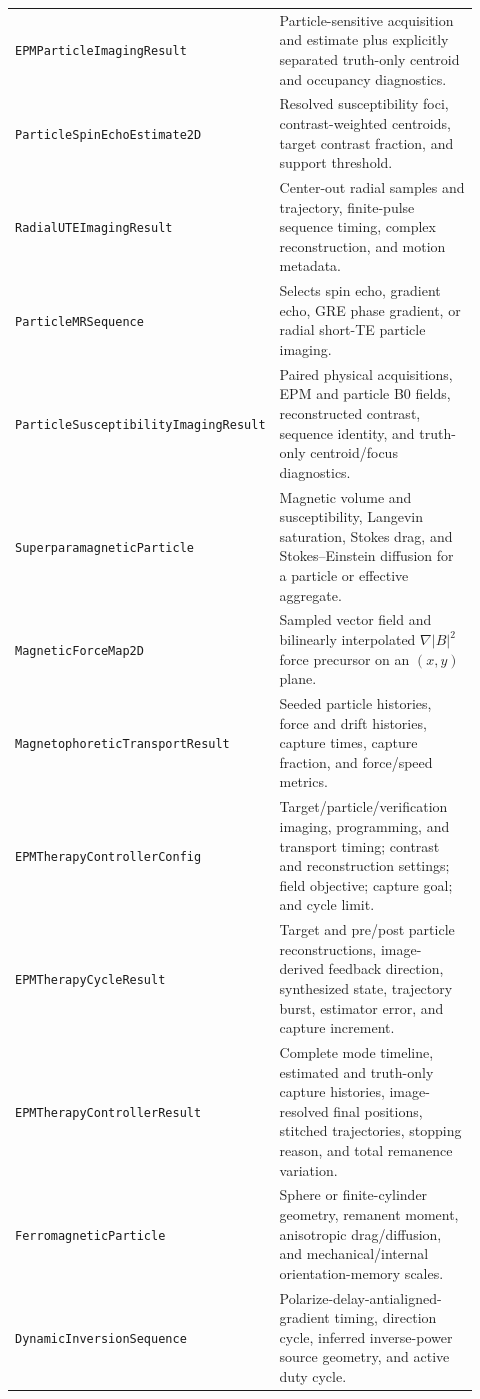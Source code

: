 \documentclass[11pt,oneside]{report}
\newcommand{\code}[1]{\texttt{#1}}
\begin{document}
\begin{longtable}{p{0.43\linewidth}p{0.49\linewidth}}
\code{EPMParticleImagingResult} & Particle-sensitive acquisition and estimate plus explicitly separated truth-only centroid and occupancy diagnostics. \\
\code{ParticleSpinEchoEstimate2D} & Resolved susceptibility foci, contrast-weighted centroids, target contrast fraction, and support threshold. \\
\code{RadialUTEImagingResult} & Center-out radial samples and trajectory, finite-pulse sequence timing, complex reconstruction, and motion metadata. \\
\code{ParticleMRSequence} & Selects spin echo, gradient echo, GRE phase gradient, or radial short-TE particle imaging. \\
\code{ParticleSusceptibilityImagingResult} & Paired physical acquisitions, EPM and particle B0 fields, reconstructed contrast, sequence identity, and truth-only centroid/focus diagnostics. \\
\code{SuperparamagneticParticle} & Magnetic volume and susceptibility, Langevin saturation, Stokes drag, and Stokes--Einstein diffusion for a particle or effective aggregate. \\
\code{MagneticForceMap2D} & Sampled vector field and bilinearly interpolated $\nabla |B|^2$ force precursor on an $(x,y)$ plane. \\
\code{MagnetophoreticTransportResult} & Seeded particle histories, force and drift histories, capture times, capture fraction, and force/speed metrics. \\
\code{EPMTherapyControllerConfig} & Target/particle/verification imaging, programming, and transport timing; contrast and reconstruction settings; field objective; capture goal; and cycle limit. \\
\code{EPMTherapyCycleResult} & Target and pre/post particle reconstructions, image-derived feedback direction, synthesized state, trajectory burst, estimator error, and capture increment. \\
\code{EPMTherapyControllerResult} & Complete mode timeline, estimated and truth-only capture histories, image-resolved final positions, stitched trajectories, stopping reason, and total remanence variation. \\
\code{FerromagneticParticle} & Sphere or finite-cylinder geometry, remanent moment, anisotropic drag/diffusion, and mechanical/internal orientation-memory scales. \\
\code{DynamicInversionSequence} & Polarize-delay-antialigned-gradient timing, direction cycle, inferred inverse-power source geometry, and active duty cycle. \\

\end{longtable}
\end{document}
